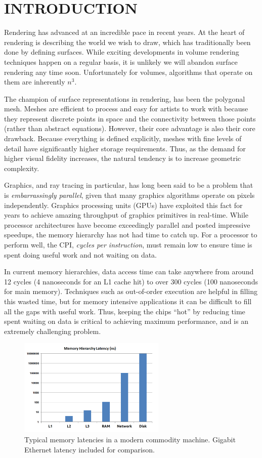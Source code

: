 \documentclass[a4paper,twoside]{article}
\begin{document}
\section{\uppercase{Introduction}}
Rendering has advanced at an incredible pace in recent years. At the heart of
rendering is describing the world we wish to draw, which has traditionally been
done by defining surfaces. While exciting developments in volume rendering
techniques happen on a regular basis, it is unlikely we will abandon surface
rendering any time soon. Unfortunately for volumes, algorithms that operate on
them are inherently $n^3$.

The champion of surface representations in rendering, has been the polygonal
mesh. Meshes are efficient to process and easy for artists to work with because
they represent discrete points in space and the connectivity between those
points (rather than abstract equations). However, their core advantage is also
their core drawback. Because everything is defined explicitly, meshes with fine
levels of detail have significantly higher storage requirements. Thus, as the
demand for higher visual fidelity increases, the natural tendency is to increase
geometric complexity.

Graphics, and ray tracing in particular, has long been said to be a problem that
is \emph{embarrassingly parallel}, given that many graphics algorithms operate
on pixels independently. Graphics processing units (GPUs) have exploited this
fact for years to achieve amazing throughput of graphics primitives in real-time.
While processor architectures have become exceedingly parallel and posted
impressive speedups, the memory hierarchy has not had time to catch up. For a
processor to perform well, the CPI, \emph{cycles per instruction}, must remain
low to ensure time is spent doing useful work and not waiting on data.

In current memory hierarchies, data access time can take anywhere from around
12 cycles (4 nanoseconds for an L1 cache hit) to over 300 cycles (100
nanoseconds for main memory). Techniques such as out-of-order execution are
helpful in filling this wasted time, but for memory intensive applications it
can be difficult to fill all the gaps with useful work. Thus, keeping the chips
``hot'' by reducing time spent waiting on data is critical to achieving maximum
performance, and is an extremely challenging problem.

\begin{figure}[h!]
    \centering
    \includegraphics[width=70mm]{figures/memorylatency.png}
    \caption{Typical memory latencies in a modern commodity machine. Gigabit Ethernet latency included for comparison.}
    \label{fig:memlatency}
\end{figure}
\end{document}
